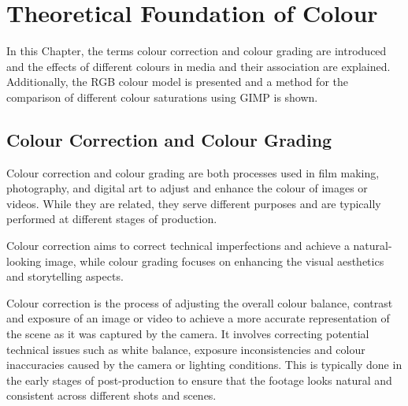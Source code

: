 \documentclass[../MasterThesis.tex]{subfiles}
\begin{document}
	

%
%
%
%
%
%
%
%
\newpage

\section{Theoretical Foundation of Colour} \label{section:theoreticalfoundationofcolour}

In this Chapter, the terms colour correction and colour grading are introduced and the effects of different colours in media and their association are explained. Additionally, the RGB colour model is presented and a method for the comparison of different colour saturations using GIMP is shown.





\subsection{Colour Correction and Colour Grading} 


Colour correction and colour grading are both processes used in film making, photography, and digital art to adjust and enhance the colour of images or videos. 
While they are related, they serve different purposes and are typically performed at different stages of production.

Colour correction aims to correct technical imperfections and achieve a natural-looking image, while colour grading focuses on enhancing the visual aesthetics and storytelling aspects.~\cite{cc_cg_1, cc_cg_2}


Colour correction is the process of adjusting the overall colour balance, contrast and exposure of an image or video to achieve a more accurate representation of the scene as it was captured by the camera. It involves correcting potential technical issues such as white balance, exposure inconsistencies and colour inaccuracies caused by the camera or lighting conditions.
This is typically done in the early stages of post-production to ensure that the footage looks natural and consistent across different shots and scenes.~\cite{cc1, cc_cg_1, cc_cg_2}
\end{document}
